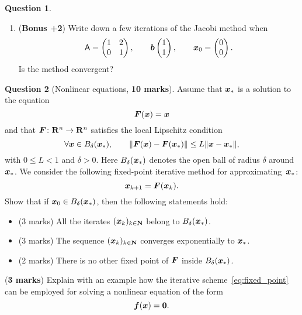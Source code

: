 \documentclass[11pt]{article}
\theoremstyle{definition}
\newtheorem{question}{Question}
\begin{document}
\begin{question}
\begin{enumerate}
        \item
            (\textbf{Bonus +2})
            Write down a few iterations of the Jacobi method when
            \[
                \mathsf A =
                \begin{pmatrix}
                    1 & 2 \\
                    0 & 1
                \end{pmatrix},
                \qquad
                \mathbf{\boldsymbol{b}}
                \begin{pmatrix}
                    1 \\
                    1
                \end{pmatrix},
                \qquad
                \mathbf{\boldsymbol{x}}_0 =
                \begin{pmatrix}
                    0 \\
                    0
                \end{pmatrix}.
            \]
            Is the method convergent?
    \end{enumerate}
\end{question}

\newpage
\begin{question}
    [Nonlinear equations, \textbf{10 marks}]
    Assume that $\mathbf{\boldsymbol{x}}_*$ is a solution to the equation
    \[
        \mathbf{\boldsymbol{F}}(\mathbf{\boldsymbol{x}}) = \mathbf{\boldsymbol{x}}
    \]
    and that $\mathbf{\boldsymbol{F}}\colon \mathbf R^n \to \mathbf R^n$ satisfies the local Lipschitz condition
    \begin{equation}
        \label{eq:local_lipschitz}
        \forall \vect x \in B_{\delta}(\vect x_*), \qquad
        \norm[big]{\vect F(\vect x) - \vect F(\vect x_*)} \leq L \norm{\vect x - \vect x_*},
    \end{equation}
    with $0 \leq L < 1$ and $\delta > 0$.
    Here $B_{\delta}(\mathbf{\boldsymbol{x}}_*)$ denotes the open ball of radius $\delta$ around $\mathbf{\boldsymbol{x}}_*$.
    We consider the following fixed-point iterative method for approximating~$\mathbf{\boldsymbol{x}}_*$:
    \begin{equation}
        \label{eq:fixed_point}
        \mathbf{\boldsymbol{x}}_{k+1} = \mathbf{\boldsymbol{F}}(\mathbf{\boldsymbol{x}}_k).
    \end{equation}
    Show that if $\mathbf{\boldsymbol{x}}_0 \in B_{\delta}(\mathbf{\boldsymbol{x}}_*)$,
    then the following statements hold:
    \begin{itemize}
        \item (3 marks) All the iterates $(\mathbf{\boldsymbol{x}}_k)_{k \in \mathbf N}$ belong to $B_{\delta}(\mathbf{\boldsymbol{x}}_*)$.
        \item (3 marks) The sequence $(\mathbf{\boldsymbol{x}}_k)_{k \in \mathbf N}$ converges exponentially to $\mathbf{\boldsymbol{x}}_*$.
        \item (2 marks) There is no other fixed point of $\mathbf{\boldsymbol{F}}$ inside $B_{\delta}(\mathbf{\boldsymbol{x}}_*)$.
    \end{itemize}
    (\textbf{3 marks})
    Explain with an example how the iterative scheme~\eqref{eq:fixed_point} can be employed for solving a nonlinear equation of the form
    \[
        \mathbf{\boldsymbol{f}}(\mathbf{\boldsymbol{x}}) = \mathbf{\boldsymbol{0}}.
    \]
\end{question}
\end{document}
